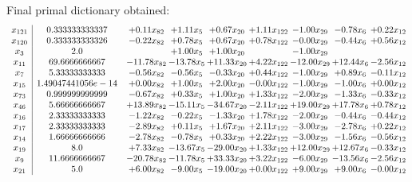 \documentclass[8pt]{article}
\begin{document}
 Final primal dictionary obtained: 
\[\begin{array}{c| c c@{\hskip 2pt} c@{\hskip 2pt} c@{\hskip 2pt} c@{\hskip 2pt} c@{\hskip 2pt} c@{\hskip 2pt} c@{\hskip 2pt} }
 x_{121}   &  0.333333333337 & +  0.11 x_{82} & +  1.11 x_{5} & +  0.67 x_{20} & +  1.11 x_{122} & -1.00 x_{29} & -0.78 x_{6} & +  0.22 x_{12}\\
 x_{120}   &  0.333333333326 & -0.22 x_{82} & +  0.78 x_{5} & +  0.67 x_{20} & +  0.78 x_{122} & -0.00 x_{29} & -0.44 x_{6} & +  0.56 x_{12}\\
 x_{3}   &  2.0  &   & +  1.00 x_{5} & +  1.00 x_{20} &   & -1.00 x_{29} &    &   \\
 x_{11}   &  69.6666666667 & -11.78 x_{82} & -13.78 x_{5} & + 11.33 x_{20} & +  4.22 x_{122} & -12.00 x_{29} & + 12.44 x_{6} & -2.56 x_{12}\\
 x_{7}   &  5.33333333333 & -0.56 x_{82} & -0.56 x_{5} & -0.33 x_{20} & +  0.44 x_{122} & -1.00 x_{29} & +  0.89 x_{6} & -0.11 x_{12}\\
 x_{15}   &  1.49047441056e-14 & +  0.00 x_{82} & +  1.00 x_{5} & +  2.00 x_{20} & -0.00 x_{122} & -1.00 x_{29} & -1.00 x_{6} & +  0.00 x_{12}\\
 x_{73}   &  0.999999999999 & -0.67 x_{82} & +  0.33 x_{5} & +  1.00 x_{20} & +  1.33 x_{122} & -2.00 x_{29} & -1.33 x_{6} & -0.33 x_{12}\\
 x_{46}   &  5.66666666667 & + 13.89 x_{82} & -15.11 x_{5} & -34.67 x_{20} & -2.11 x_{122} & + 19.00 x_{29} & + 17.78 x_{6} & +  0.78 x_{12}\\
 x_{16}   &  2.33333333333 & -1.22 x_{82} & -0.22 x_{5} & -1.33 x_{20} & +  1.78 x_{122} & -2.00 x_{29} & -0.44 x_{6} & -0.44 x_{12}\\
 x_{17}   &  2.33333333333 & -2.89 x_{82} & +  0.11 x_{5} & +  1.67 x_{20} & +  2.11 x_{122} & -3.00 x_{29} & -2.78 x_{6} & +  0.22 x_{12}\\
 x_{14}   &  1.66666666666 & -2.78 x_{82} & -0.78 x_{5} & +  0.33 x_{20} & +  2.22 x_{122} & -3.00 x_{29} & -1.56 x_{6} & -0.56 x_{12}\\
 x_{19}   &  8.0 & +  7.33 x_{82} & -13.67 x_{5} & -29.00 x_{20} & +  1.33 x_{122} & + 12.00 x_{29} & + 12.67 x_{6} & -0.33 x_{12}\\
 x_{9}   &  11.6666666667 & -20.78 x_{82} & -11.78 x_{5} & + 33.33 x_{20} & +  3.22 x_{122} & -6.00 x_{29} & -13.56 x_{6} & -2.56 x_{12}\\
 x_{21}   &  5.0 & +  6.00 x_{82} & -9.00 x_{5} & -19.00 x_{20} & +  0.00 x_{122} & +  9.00 x_{29} & +  9.00 x_{6} & -0.00 x_{12}\\

\end{array}\]
\end{document}

